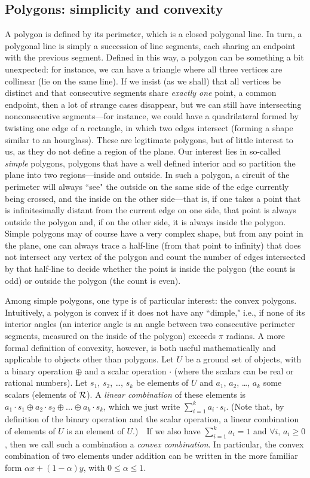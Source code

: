 \documentclass[11pt]{article}
\begin{document}
\subsection{Polygons: simplicity and convexity}
A polygon is defined by its perimeter, which is a closed polygonal line.
In turn, a polygonal line is simply a succession of line segments, each
sharing an endpoint with the previous segment.  Defined in this way,
a polygon can be something a bit unexpected: for instance, we can
have a triangle where all three vertices are collinear (lie on the same
line).  If we insist (as we shall) that all vertices be distinct and
that consecutive segments share \emph{exactly one} point, a common
endpoint, then a lot of strange cases disappear, but we can still have
intersecting nonconsecutive segments---for instance, we could have
a quadrilateral formed by twisting one edge of a rectangle, in which
two edges intersect (forming a shape similar to an hourglass). These
are legitimate polygons, but of little interest to us, as they do not
define a region of the plane.  Our interest lies in so-called \emph{simple}
polygons, polygons that have a well defined interior and so partition the
plane into two regions---inside and outside.   In such a polygon, a circuit
of the perimeter will always ``see" the outside on the same side of the edge
currently being crossed, and the inside on the other side---that is, if one
takes a point that is infinitesimally distant from the current edge on one
side, that point is always outside the polygon and, if on the other side,
it is always inside the polygon.  Simple polygons may of course have a very
complex shape, but from any point in the plane, one can always trace
a half-line (from that point to infinity) that does not intersect any vertex
of the polygon and count the number of edges intersected by that half-line
to decide whether the point is inside the polygon (the count is odd) or outside
the polygon (the count is even).

Among simple polygons, one type is of particular interest: the convex polygons.
Intuitively, a polygon is convex if it does not have any ``dimple," i.e., if
none of its interior angles (an interior angle is an angle between two
consecutive perimeter segments, measured on the inside of the polygon) exceeds
$\pi$ radians.  A more formal definition of convexity, however, is both
useful mathematically and applicable to objects other than polygons.
Let $U$ be a  ground set of objects, with a binary operation $\oplus$
and a scalar operation $\cdot$ (where the scalars can be real or rational
numbers).
Let $s_1$, $s_2$, \dots, $s_k$ be elements of $U$ and $a_1$, $a_2$, \dots,
$a_k$ some scalars (elements of $\cal{R}$).  A \emph{linear combination}
of these elements is $a_1\cdot s_1 \oplus a_2\cdot s_2 \oplus
\ldots \oplus a_k\cdot s_k$, which we just write $\sum_{i=1}^k a_i\cdot s_i$.
(Note that, by definition of the binary operation and the scalar operation,
a linear combination of elements of $U$ is an element of $U$.)\ \ 
If we also have $\sum_{i=1}^k a_i = 1$ and $\forall i,\,a_i\geq 0$, then
we call such a combination a \emph{convex combination}.  In particular,
the convex combination of two elements under addition can be written
in the more familiar form $\alpha x + (1-\alpha) y$,
with $0 \leq \alpha \leq 1$.
\end{document}
